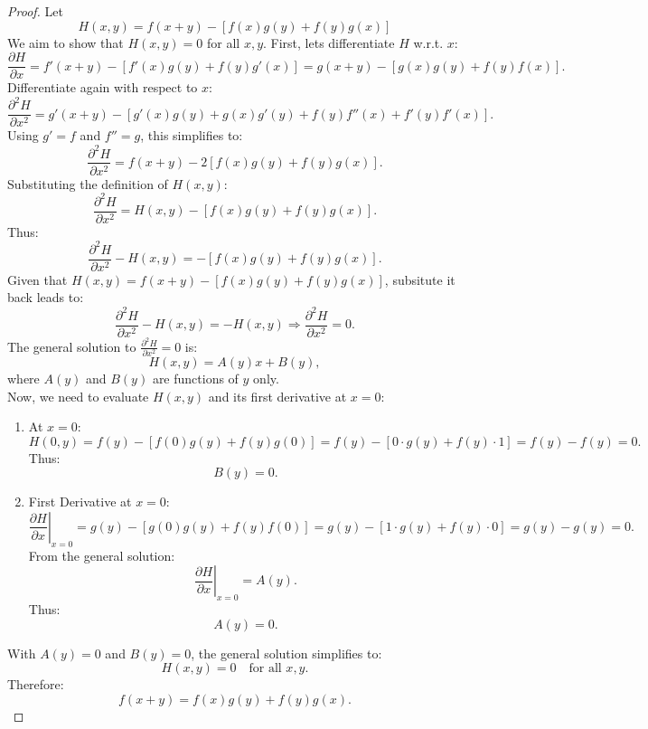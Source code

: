 \documentclass{article}
\begin{document}
\begin{proof}
    Let 
    \[ H(x,y) = f(x + y) - [f(x)g(y) + f(y)g(x)] \]
    We aim to show that $H(x,y) = 0$ for all $x,y$.
    First, lets differentiate $H$ w.r.t. $x$:
    \[
        \frac{\partial H}{\partial x} = f'(x + y) - \left[f'(x)g(y) + f(y)g'(x)\right] = g(x + y) - \left[g(x)g(y) + f(y)f(x)\right].
    \]
    Differentiate again with respect to \( x \):
    \[
        \frac{\partial^2 H}{\partial x^2} = g'(x + y) - \left[g'(x)g(y) + g(x)g'(y) + f(y)f''(x) + f'(y)f'(x)\right].
    \]
    Using \( g' = f \) and \( f'' = g \), this simplifies to:
    \[
        \frac{\partial^2 H}{\partial x^2} = f(x + y) - 2\left[f(x)g(y) + f(y)g(x)\right].
    \]
    Substituting the definition of \( H(x, y) \):
    \[
        \frac{\partial^2 H}{\partial x^2} = H(x, y) - [f(x)g(y) + f(y)g(x)].
    \]
    Thus:
    \[
        \frac{\partial^2 H}{\partial x^2} - H(x, y) = -[f(x)g(y) + f(y)g(x)].
    \]
    Given that $H(x,y) = f(x + y) - [f(x)g(y) + f(y)g(x)]$, subsitute it back leads to:
    \[ 
        \frac{\partial^2 H}{\partial x^2} - H(x, y) = -H(x,y)
        \Rightarrow
        \frac{\partial^2 H}{\partial x^2} = 0.
    \]
    The general solution to \( \frac{\partial^2 H}{\partial x^2} = 0 \) is:
    \[
        H(x, y) = A(y) x + B(y),
    \]
    where \( A(y) \) and \( B(y) \) are functions of \( y \) only.
    \\
    Now, we need to evaluate \( H(x, y) \) and its first derivative at \( x = 0 \):
    \begin{enumerate}
        \item At \( x = 0 \):
        \[
            H(0, y) = f(y) - [f(0)g(y) + f(y)g(0)] = f(y) - [0 \cdot g(y) + f(y) \cdot 1] = f(y) - f(y) = 0.
        \]
        Thus:
        \[
            B(y) = 0.
        \]
        \item First Derivative at \( x = 0 \):
        \[
            \left.\frac{\partial H}{\partial x}\right|_{x=0} = g(y) - [g(0)g(y) + f(y)f(0)] = g(y) - [1 \cdot g(y) + f(y) \cdot 0] = g(y) - g(y) = 0.
        \]
        From the general solution:
        \[
            \left.\frac{\partial H}{\partial x}\right|_{x=0} = A(y).
        \]
        Thus:
        \[
            A(y) = 0.
        \]
    \end{enumerate}
    With \( A(y) = 0 \) and \( B(y) = 0 \), the general solution simplifies to:
    \[
        H(x, y) = 0 \quad \text{for all } x, y.
    \]
    Therefore:
    \[
        f(x + y) = f(x)g(y) + f(y)g(x).
    \]
\end{proof}
\end{document}
